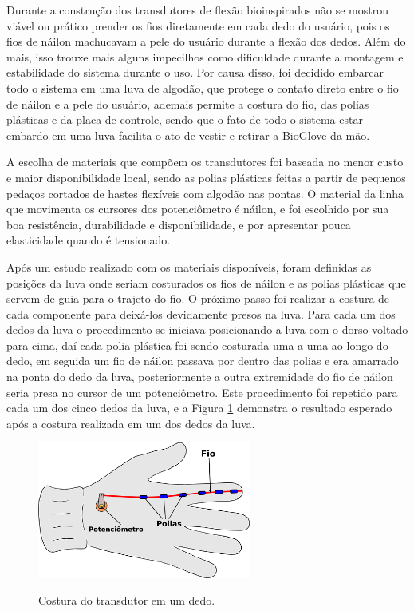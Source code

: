 \documentclass[
	12pt,				%
	openright,			%
	oneside,			%
	a4paper,			%
	english,			%
	brazil				%
	]{abntex2}
\begin{document}
		Durante a construção dos transdutores de flexão bioinspirados não se mostrou viável ou prático prender os fios diretamente em cada dedo do usuário, pois os fios de náilon machucavam a pele do usuário durante a flexão dos dedos. Além do mais, isso trouxe mais alguns impecilhos como dificuldade durante a montagem e estabilidade do sistema durante o uso. Por causa disso, foi decidido embarcar todo o sistema em uma luva de algodão, que protege o contato direto entre o fio de náilon e a pele do usuário, ademais permite a costura do fio, das polias plásticas e da placa de controle, sendo que o fato de todo o sistema estar embardo em uma luva facilita o ato de vestir e retirar a BioGlove da mão.
		
		A escolha de materiais que compõem os transdutores foi baseada no menor custo e maior disponibilidade local, sendo as polias plásticas feitas a partir de pequenos pedaços cortados de hastes flexíveis com algodão nas pontas. O material da linha que movimenta os cursores dos potenciômetro é náilon, e foi escolhido por sua boa resistência, durabilidade e disponibilidade, e por apresentar pouca elasticidade quando é tensionado.


		Após um estudo realizado com os materiais disponíveis, foram definidas as posições da luva onde seriam costurados os fios de náilon e as polias plásticas que servem de guia para o trajeto do fio. O próximo passo foi realizar a costura de cada componente para deixá-los devidamente presos na luva. Para cada um dos dedos da luva o procedimento se iniciava posicionando a luva com o dorso voltado para cima, daí cada polia plástica foi sendo costurada uma a uma ao longo do dedo, em seguida um fio de náilon passava por dentro das polias e era amarrado na ponta do dedo da luva, posteriormente a outra extremidade do fio de náilon seria presa no cursor de um potenciômetro. Este procedimento foi repetido para cada um dos cinco dedos da luva, e a Figura \ref{Fig:glove-wire-pot1} demonstra o resultado esperado após a costura realizada em um dos dedos da luva.


		\begin{figure}[h!]
			\centering
			\caption{Costura do transdutor em um dedo.}
  		\includegraphics[width=7cm]{./figures/glove-wire-pot1.png}
  		\label{Fig:glove-wire-pot1}
		\end{figure}
\end{document}
